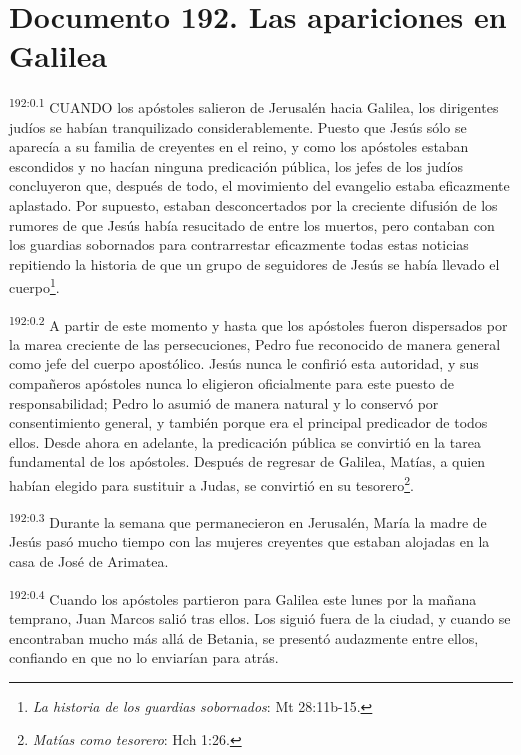 \chapter{Documento 192. Las apariciones en Galilea}
\par 
\textsuperscript{192:0.1} CUANDO los apóstoles salieron de Jerusalén hacia Galilea, los dirigentes judíos se habían tranquilizado considerablemente. Puesto que Jesús sólo se aparecía a su familia de creyentes en el reino, y como los apóstoles estaban escondidos y no hacían ninguna predicación pública, los jefes de los judíos concluyeron que, después de todo, el movimiento del evangelio estaba eficazmente aplastado. Por supuesto, estaban desconcertados por la creciente difusión de los rumores de que Jesús había resucitado de entre los muertos, pero contaban con los guardias sobornados para contrarrestar eficazmente todas estas noticias repitiendo la historia de que un grupo de seguidores de Jesús se había llevado el cuerpo\footnote{\textit{La historia de los guardias sobornados}: Mt 28:11b-15.}.

\par 
\textsuperscript{192:0.2} A partir de este momento y hasta que los apóstoles fueron dispersados por la marea creciente de las persecuciones, Pedro fue reconocido de manera general como jefe del cuerpo apostólico. Jesús nunca le confirió esta autoridad, y sus compañeros apóstoles nunca lo eligieron oficialmente para este puesto de responsabilidad; Pedro lo asumió de manera natural y lo conservó por consentimiento general, y también porque era el principal predicador de todos ellos. Desde ahora en adelante, la predicación pública se convirtió en la tarea fundamental de los apóstoles. Después de regresar de Galilea, Matías, a quien habían elegido para sustituir a Judas, se convirtió en su tesorero\footnote{\textit{Matías como tesorero}: Hch 1:26.}.

\par 
\textsuperscript{192:0.3} Durante la semana que permanecieron en Jerusalén, María la madre de Jesús pasó mucho tiempo con las mujeres creyentes que estaban alojadas en la casa de José de Arimatea.

\par 
\textsuperscript{192:0.4} Cuando los apóstoles partieron para Galilea este lunes por la mañana temprano, Juan Marcos salió tras ellos. Los siguió fuera de la ciudad, y cuando se encontraban mucho más allá de Betania, se presentó audazmente entre ellos, confiando en que no lo enviarían para atrás.

